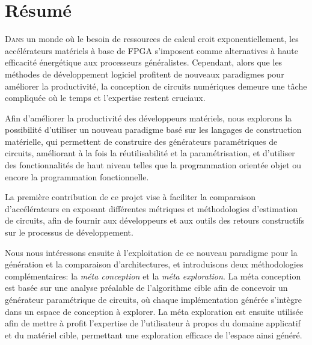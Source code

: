 

\clearpage
{}
{}
\chapter*{Résumé}
{\fontsize{11.45pt}{13.5pt}\selectfont 
\lettrine[lines=2]{D}{ans} un monde où le besoin de ressources de calcul croit exponentiellement, les accélérateurs matériels à base de FPGA s'imposent comme alternatives à haute efficacité énergétique aux processeurs généralistes.
Cependant, alors que les méthodes de développement logiciel profitent de nouveaux paradigmes pour améliorer la productivité, la conception de circuits numériques demeure une tâche compliquée où le temps et l'expertise restent cruciaux.

Afin d'améliorer la productivité des développeurs matériels, nous explorons la possibilité d'utiliser un nouveau paradigme basé sur les langages de construction matérielle, qui permettent de construire des générateurs paramétriques de circuits, améliorant à la fois la réutilisabilité et la paramétrisation, et d'utiliser des fonctionnalités de haut niveau telles que la programmation orientée objet ou encore la programmation fonctionnelle.

La première contribution de ce projet vise à faciliter la comparaison d'accélérateurs en exposant différentes métriques et méthodologies d'estimation de circuits, afin de fournir aux développeurs et aux outils des retours constructifs sur le processus de développement.

Nous nous intéressons ensuite à l'exploitation de ce nouveau paradigme pour la génération et la comparaison d'architectures, et introduisons deux méthodologies complémentaires: la {\it méta conception} et la {\it méta exploration}.
La méta conception est basée sur une analyse préalable de l'algorithme cible afin de concevoir un générateur paramétrique de circuits, où chaque implémentation générée s'intègre dans un espace de conception à explorer.
La méta exploration est ensuite utilisée afin de mettre à profit l'expertise de l'utilisateur à propos du domaine applicatif et du matériel cible, permettant une exploration efficace de l'espace ainsi généré.

}
